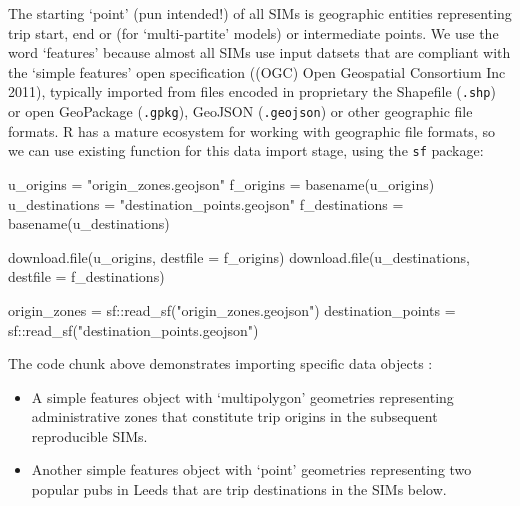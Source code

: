 \documentclass[11pt,letterpaper]{article}
\newenvironment{Shaded}{\begin{snugshade}}{\end{snugshade}}
\newcommand{\AttributeTok}[1]{\textcolor[rgb]{0.77,0.63,0.00}{#1}}
\newcommand{\FunctionTok}[1]{\textcolor[rgb]{0.00,0.00,0.00}{#1}}
\newcommand{\NormalTok}[1]{#1}
\newcommand{\OtherTok}[1]{\textcolor[rgb]{0.56,0.35,0.01}{#1}}
\newcommand{\SpecialCharTok}[1]{\textcolor[rgb]{0.00,0.00,0.00}{#1}}
\newcommand{\StringTok}[1]{\textcolor[rgb]{0.31,0.60,0.02}{#1}}
\begin{document}
The starting `point' (pun intended!) of all SIMs is geographic entities representing trip start, end or (for `multi-partite' models) or intermediate points.
We use the word `features' because almost all SIMs use input datsets that are compliant with the `simple features' open specification ((OGC) Open Geospatial Consortium Inc 2011), typically imported from files encoded in proprietary the Shapefile (\texttt{.shp}) or open GeoPackage (\texttt{.gpkg}), GeoJSON (\texttt{.geojson}) or other geographic file formats.
R has a mature ecosystem for working with geographic file formats, so we can use existing function for this data import stage, using the \texttt{sf} package:

\begin{Shaded}
\begin{Highlighting}[]
\NormalTok{u\_origins }\OtherTok{=} \StringTok{"origin\_zones.geojson"}
\NormalTok{f\_origins }\OtherTok{=} \FunctionTok{basename}\NormalTok{(u\_origins)}
\NormalTok{u\_destinations }\OtherTok{=} \StringTok{"destination\_points.geojson"}
\NormalTok{f\_destinations }\OtherTok{=} \FunctionTok{basename}\NormalTok{(u\_destinations)}
\end{Highlighting}
\end{Shaded}

\begin{Shaded}
\begin{Highlighting}[]
\FunctionTok{download.file}\NormalTok{(u\_origins, }\AttributeTok{destfile =}\NormalTok{ f\_origins)}
\FunctionTok{download.file}\NormalTok{(u\_destinations, }\AttributeTok{destfile =}\NormalTok{ f\_destinations)}
\end{Highlighting}
\end{Shaded}

\begin{Shaded}
\begin{Highlighting}[]
\NormalTok{origin\_zones }\OtherTok{=}\NormalTok{ sf}\SpecialCharTok{::}\FunctionTok{read\_sf}\NormalTok{(}\StringTok{"origin\_zones.geojson"}\NormalTok{)}
\NormalTok{destination\_points }\OtherTok{=}\NormalTok{ sf}\SpecialCharTok{::}\FunctionTok{read\_sf}\NormalTok{(}\StringTok{"destination\_points.geojson"}\NormalTok{)}
\end{Highlighting}
\end{Shaded}

The code chunk above demonstrates importing specific data objects :

\begin{itemize}
\item
  A simple features object with `multipolygon' geometries representing administrative zones that constitute trip origins in the subsequent reproducible SIMs.
\item
  Another simple features object with `point' geometries representing two popular pubs in Leeds that are trip destinations in the SIMs below.
\end{itemize}
\end{document}
